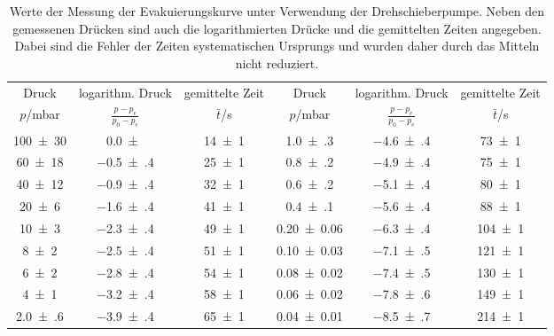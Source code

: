 \begin{table}[!h]
	\centering
	\begin{adjustbox}{width=\textwidth}
	\begin{tabular}{cccccc}
		\toprule
		Druck & logarithm. Druck & gemittelte Zeit & Druck & logarithm. Druck & gemittelte Zeit\\
		$p$/\si{mbar} & $\frac{p-p_e}{p_0-p_e}$ & $\bar{t}$/\si{s} & $p$/\si{mbar} & $\frac{p-p_e}{p_0-p_e}$ & $\bar{t}$/\si{s}\\
\midrule
		\num{100(30)} & \num{0.0(0)} & \num{14(1)} & \num{1.0(3)} & \num{-4.6(4)} & \num{73(1)}\\
		\num{60(18)} & \num{-0.5(4)} & \num{25(1)} & \num{0.8(2)} & \num{-4.9(4)} & \num{75(1)}\\
		\num{40(12)} & \num{-0.9(4)} & \num{32(1)} & \num{0.6(2)} & \num{-5.1(4)} & \num{80(1)}\\
		\num{20(6)} & \num{-1.6(4)} & \num{41(1)} & \num{0.4(1)} & \num{-5.6(4)} & \num{88(1)}\\
		\num{10(3)} & \num{-2.3(4)} & \num{49(1)} & \num{0.20(6)} & \num{-6.3(4)} & \num{104(1)}\\
		\num{8(2)} & \num{-2.5(4)} & \num{51(1)} & \num{0.10(3)} & \num{-7.1(5)} & \num{121(1)}\\
		\num{6(2)} & \num{-2.8(4)} & \num{54(1)} & \num{0.08(2)} & \num{-7.4(5)} & \num{130(1)}\\
		\num{4(1)} & \num{-3.2(4)} & \num{58(1)} & \num{0.06(2)} & \num{-7.8(6)} & \num{149(1)}\\
		\num{2.0(6)} & \num{-3.9(4)} & \num{65(1)} & \num{0.04(1)} & \num{-8.5(7)} & \num{214(1)}\\
		\bottomrule
	\end{tabular}
	\end{adjustbox}
	\caption{Werte der Messung der Evakuierungskurve unter Verwendung der Drehschieberpumpe.
                        Neben den gemessenen Drücken sind auch die logarithmierten Drücke und die gemittelten
                        Zeiten angegeben. Dabei sind die Fehler der Zeiten systematischen Ursprungs und wurden 
                        daher durch das Mitteln nicht reduziert. \label{tab:Evakuierungskurve_Drehschieber}}
\end{table}
